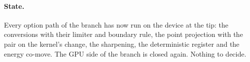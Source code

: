 \documentclass[11pt,a4paper]{article}
\begin{document}
\paragraph{State.}  Every option path of the branch has now run on the
device at the tip: the conversions with their limiter and boundary
rule, the point projection with the pair on the kernel's change, the
sharpening, the deterministic register and the energy co-move.  The
GPU side of the branch is closed again.  Nothing to decide.
\end{document}

